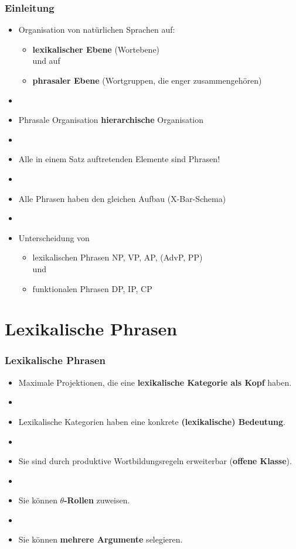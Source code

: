 \begin{frame}
\frametitle{Einleitung}

\begin{itemize}
	\item Organisation von natürlichen Sprachen auf:
	\begin{itemize}
		\item \textbf{lexikalischer Ebene} (Wortebene)\\
		und auf
		\item \textbf{phrasaler Ebene} (Wortgruppen, die enger zusammengehören)
	\end{itemize}
	\item[]
	\item Phrasale Organisation \ras \textbf{hierarchische} Organisation
	\item[]
	\item Alle in einem Satz auftretenden Elemente sind Phrasen!
	\item[]
	\item Alle Phrasen haben den gleichen Aufbau (X-Bar-Schema)
	\item[]
	\item Unterscheidung von
	\begin{itemize}
		\item lexikalischen Phrasen \ras NP, VP, AP, (AdvP, PP)\\
		und
		\item funktionalen Phrasen \ras DP, IP, CP
	\end{itemize}
\end{itemize}

\end{frame}


\section{Lexikalische Phrasen}

\begin{frame}
\frametitle{Lexikalische Phrasen}

\begin{itemize}
	\item Maximale Projektionen, die eine \textbf{lexikalische Kategorie als Kopf} haben.
	\item[]
	\item Lexikalische Kategorien haben eine konkrete \textbf{(lexikalische) Bedeutung}.
	\item[]
	\item Sie sind durch produktive Wortbildungsregeln erweiterbar (\textbf{offene Klasse}).
	\item[]
	\item Sie können \textbf{$\theta$-Rollen} zuweisen.
	\item[]
	\item Sie können \textbf{mehrere Argumente} selegieren.
\end{itemize}


\end{frame}


